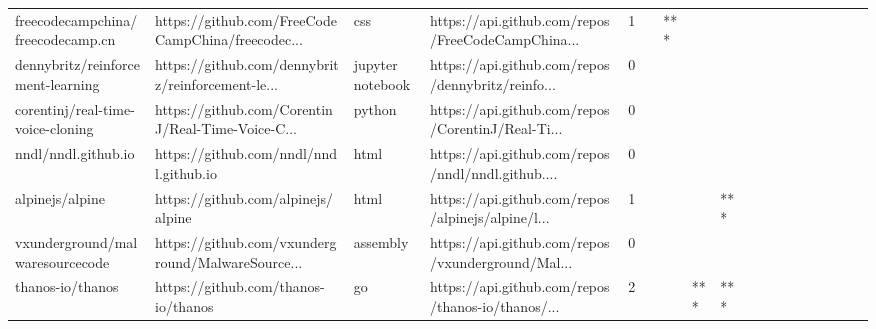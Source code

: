 \begin{tabular}{llllrlllllllllllll}
freecodecampchina/freecodecamp.cn                  &  https://github.com/FreeCodeCampChina/freecodec... &               css &  https://api.github.com/repos/FreeCodeCampChina... &       1 &         &    *** &           &                &                 &        &           &           &          &          &       &              &          \\
dennybritz/reinforcement-learning                  &  https://github.com/dennybritz/reinforcement-le... &  jupyter notebook &  https://api.github.com/repos/dennybritz/reinfo... &       0 &         &        &           &                &                 &        &           &           &          &          &       &              &          \\
corentinj/real-time-voice-cloning                  &  https://github.com/CorentinJ/Real-Time-Voice-C... &            python &  https://api.github.com/repos/CorentinJ/Real-Ti... &       0 &         &        &           &                &                 &        &           &           &          &          &       &              &          \\
nndl/nndl.github.io                                &             https://github.com/nndl/nndl.github.io &              html &  https://api.github.com/repos/nndl/nndl.github.... &       0 &         &        &           &                &                 &        &           &           &          &          &       &              &          \\
alpinejs/alpine                                    &                 https://github.com/alpinejs/alpine &              html &  https://api.github.com/repos/alpinejs/alpine/l... &       1 &         &        &           &            *** &                 &        &           &           &          &          &       &              &          \\
vxunderground/malwaresourcecode                    &  https://github.com/vxunderground/MalwareSource... &          assembly &  https://api.github.com/repos/vxunderground/Mal... &       0 &         &        &           &                &                 &        &           &           &          &          &       &              &          \\
thanos-io/thanos                                   &                https://github.com/thanos-io/thanos &                go &  https://api.github.com/repos/thanos-io/thanos/... &       2 &         &        &       *** &            *** &                 &        &           &           &          &          &       &              &          \\

\end{tabular}
